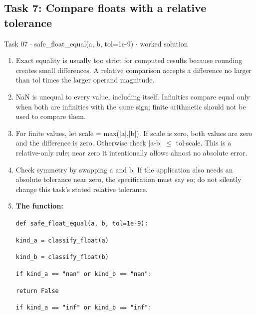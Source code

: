 \documentclass[11pt]{article}
\begin{document}
\begin{keepsection}\subsection{Task 7: Compare floats with a relative tolerance}

\begin{workedbox}{Task 07 \ensuremath{\cdot} safe\_float\_equal(a, b, tol=1e-9) \ensuremath{\cdot} worked solution}
\begin{enumerate}
\item Exact equality is usually too strict for computed results because rounding creates small differences. A relative comparison accepts a difference no larger than tol times the larger operand magnitude.
\item NaN is unequal to every value, including itself. Infinities compare equal only when both are infinities with the same sign; finite arithmetic should not be used to compare them.
\item For finite values, let scale = max(|a|,|b|). If scale is zero, both values are zero and the difference is zero. Otherwise check |a-b| \ensuremath{\leq} tol\ensuremath{\cdot}scale. This is a relative-only rule; near zero it intentionally allows almost no absolute error.
\item Check symmetry by swapping a and b. If the application also needs an absolute tolerance near zero, the specification must say so; do not silently change this task’s stated relative tolerance.
\item {}
\textbf{The function:}
\begin{tcolorbox}[colback=Paperblue,colframe=Paperblue,boxrule=0pt,arc=0pt,left=7pt,right=7pt,top=5pt,bottom=5pt]\small\sloppy
\noindent\hspace*{0em}\texttt{def safe\_float\_equal(a, b, tol=1e-9):}\par
\noindent\hspace*{1em}\texttt{kind\_a = classify\_float(a)}\par
\noindent\hspace*{1em}\texttt{kind\_b = classify\_float(b)}\par
\noindent\hspace*{1em}\texttt{if kind\_a == "nan" or kind\_b == "nan":}\par
\noindent\hspace*{3em}\texttt{return False}\par
\noindent\hspace*{1em}\texttt{if kind\_a == "inf" or kind\_b == "inf":}\par

\end{tcolorbox}
\end{enumerate}
\end{workedbox}
\end{keepsection}
\end{document}
